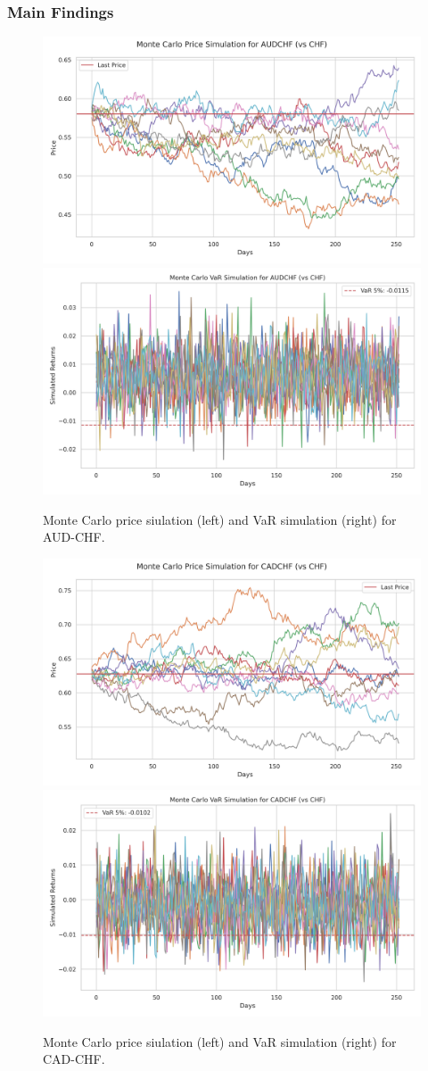\documentclass[10pt]{beamer}
\begin{document}
\begin{frame}
\frametitle{Main Findings}
\begin{figure}
    \centering  \includegraphics[width=0.48\linewidth]{reports/figures/monte_carlo_price_simulation_AUDCHF_vs_CHF.png}  \label{fig:monte_carlo_price_simulation_AUDCHF_vs_CHF}
    \includegraphics[width=0.48\linewidth]{reports/figures/monte_carlo_var_simulation_AUDCHF_vs_CHF.png}  \label{fig:monte_carlo_var_simulation_AUDCHF_vs_CHF}
    \caption{\footnotesize Monte Carlo price siulation (left) and VaR simulation (right) for AUD-CHF.}
\end{figure}
\begin{figure}
    \centering  \includegraphics[width=0.48\linewidth]{reports/figures/monte_carlo_price_simulation_CADCHF_vs_CHF.png} \label{fig:monte_carlo_price_simulation_CADCHF_vs_CHF}
    \includegraphics[width=0.48\linewidth]{reports/figures/monte_carlo_var_simulation_CADCHF_vs_CHF.png} \label{fig:monte_carlo_var_simulation_CADCHF_vs_CHF}
    \caption{\footnotesize Monte Carlo price siulation (left) and VaR simulation (right) for CAD-CHF.}
\end{figure}
\end{frame}
\end{document}
